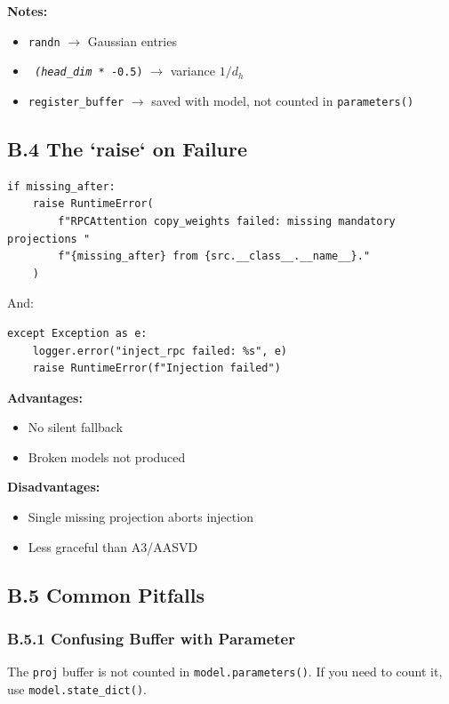\textbf{Notes:}
\begin{itemize}
\item \texttt{randn} $\to$ Gaussian entries
\item \texttt{\textit{ (head\_dim }* -0.5)} $\to$ variance $1/d_h$
\item \texttt{register\_buffer} $\to$ saved with model, not counted in \texttt{parameters()}

\end{itemize}
\subsection{B.4 The `raise` on Failure}

\begin{lstlisting}
if missing_after:
    raise RuntimeError(
        f"RPCAttention copy_weights failed: missing mandatory projections "
        f"{missing_after} from {src.__class__.__name__}."
    )
\end{lstlisting}

And:

\begin{lstlisting}
except Exception as e:
    logger.error("inject_rpc failed: %s", e)
    raise RuntimeError(f"Injection failed")
\end{lstlisting}

\textbf{Advantages:}
\begin{itemize}
\item No silent fallback
\item Broken models not produced

\end{itemize}
\textbf{Disadvantages:}
\begin{itemize}
\item Single missing projection aborts injection
\item Less graceful than A3/AASVD

\end{itemize}
\subsection{B.5 Common Pitfalls}

\subsubsection{B.5.1 Confusing Buffer with Parameter}

The \texttt{proj} buffer is not counted in \texttt{model.parameters()}. If you need 
to count it, use \texttt{model.state\_dict()}.

